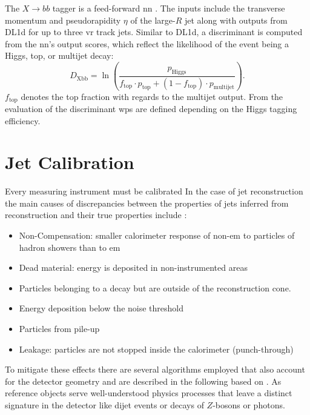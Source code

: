 The $X\rightarrow bb$ tagger is a feed-forward \ac{nn} \citep{ATL-PHYS-PUB-2020-019}. The inputs include the transverse momentum \pt and pseudorapidity $\eta$ of the large-$R$ jet along with outputs from DL1d for up to three \ac{vr} track jets. Similar to DL1d, a discriminant is computed from the \ac{nn}'s output scores, which reflect the likelihood of the event being a Higgs, top, or multijet decay:
\begin{equation}
  D_{\text{Xbb}}=\ln\left({\frac{p_{\text{Higgs}}}{f_{\text{top}}\cdot p_{\text{top}}+(1-f_{\text{top}})\cdot p_{\text{multijet}}}}\right).
\end{equation}
$f_\text{top}$ denotes the top fraction with regards to the multijet output. From the evaluation of the discriminant \acp{wp} are defined depending on the Higgs tagging efficiency.

\section{Jet Calibration}\label{sec:calibration}
Every measuring instrument must be calibrated In the case of jet reconstruction the main causes of discrepancies between the properties of jets inferred from reconstruction and their true properties include \citep{atlas2011jet}:
\begin{itemize}
  \item Non-Compensation: smaller calorimeter response of non-\ac{em} to particles of hadron showers than to \ac{em}
  \item Dead material: energy is deposited in non-instrumented areas
  \item Particles belonging to a decay but are outside of the reconstruction cone.
  \item Energy deposition below the noise threshold
  \item Particles from pile-up
  \item Leakage: particles are not stopped inside the calorimeter (punch-through)
\end{itemize}
To mitigate these effects there are several algorithms employed that also account for the detector geometry and are described in the following based on \citep{atlas2021jet}. As reference objects serve well-understood physics processes that leave a distinct signature in the detector like dijet events or decays of $Z$-bosons or photons.

